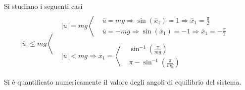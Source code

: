 Si studiano i seguenti casi
$$|\overline{u}| \leq mg\left\langle
\begin{aligned}
& \\
&|\overline{u}|=mg \left\langle \begin{aligned}
&\overline{u} = mg \Rightarrow\sin(\overline{x}_1) = 1 \Rightarrow
\overline{x}_1 = \frac{\pi}{2}\\
&\overline{u} = -mg \Rightarrow \sin(\overline{x}_1) = -1 \Rightarrow
\overline{x}_1 = -\frac{\pi}{2}
\end{aligned}  \right.
& \\
& \\
&|\overline{u}|<mg \Rightarrow \overline{x}_1 = \left\langle \begin{aligned}
&\sin^{-1}\left(\frac{\pi}{mg}\right) \\
&\pi - \sin^{-1}\left(\frac{\pi}{mg}\right)
\end{aligned}\right.
&\\
& \\
\end{aligned}\right.
$$
Si è quantificato numericamente il valore degli angoli di equilibrio del
sistema.

